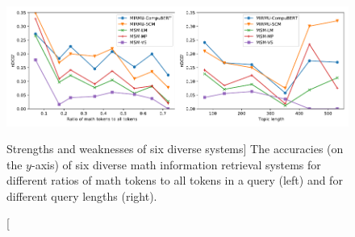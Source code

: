 \begin{figure}
\vspace*{-0.25cm}
\hspace*{-0.025\columnwidth}
\includegraphics[width=1.025\columnwidth, trim={0 3.9mm 0 0}, clip]{strengths-and-weaknesses}
\caption
  [Strengths and weaknesses of six diverse systems]%
  {The accuracies (on the $y$-axis) of six diverse math information retrieval 
   systems for different ratios of math tokens to all tokens in a query (left)
   and for different query lengths (right). \cite[Figure 8]{novotny2021ensembling}}
\label{fig:strengths-and-weaknesses}
\end{figure}
